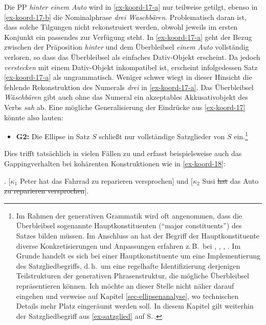 Die PP {\it hinter einem Auto} wird in \ref{ex-koord-17-a} nur teilweise getilgt, ebenso in \ref{ex-koord-17-b} die Nominalphrase {\it drei Waschbären}. Problematisch daran ist, dass solche Tilgungen nicht rekonstruiert werden, obwohl jeweils im ersten Konjunkt ein passendes  zur Verfügung steht. In \ref{ex-koord-17-a} geht der Bezug zwischen der Präposition {\it hinter} und dem Überbleibsel {\it einem Auto} vollständig verloren, so dass das Überbleibsel als einfaches Dativ-Objekt erscheint. Da jedoch {\it verstecken} mit einem Dativ-Objekt inkompatibel ist, erscheint infolgedessen Satz \ref{ex-koord-17-a} als ungrammatisch. Weniger schwer wiegt in dieser Hinsicht die fehlende Rekonstruktion des Numerals {\it drei} in \ref{ex-koord-17-a}. Das Überbleibsel {\it Wäschbären} gibt auch ohne das Numeral ein akzeptables Akkusativobjekt des Verbs {\it sah} ab. Eine mögliche Generalisierung der Eindrücke aus \ref{ex-koord-17} könnte also lauten:
\begin{itemize}
  \item[] {\bf G2:} Die Ellipse in Satz $S$ schlie\ss t nur vollständige Satzglieder von $S$ ein.\footnote{Im Rahmen der generativen Grammatik wird oft angenommen, dass die Überbleibsel sogenannte Hauptkonstituenten ("`major constituents"') des Satzes bilden müssen. Im Anschluss an \citet[Fußnote~2]{Hankamer:73} hat der Begriff der Hauptkonstituente diverse Konkretisierungen und Anpassungen erfahren z.\,B.\  bei \citet[110ff]{Neijt:79}, \citet[12ff]{Chao:87}, \citet[Fußnote 10]{Wilder:97}, \citet[145ff]{Hartmann:00}. Im Grunde handelt es sich bei einer Hauptkonstituente um eine Implementierung des Satzgliedbegriffs, d.\,h.\ um eine regelhafte Identifizierung derjenigen Teilstrukturen der generativen Phrasenstruktur, die mögliche Überbleibsel repräsentieren können. Ich möchte an dieser Stelle nicht näher darauf eingehen und verweise auf Kapitel \ref{sec-ellipsenanalyse}, wo technischen Details mehr Platz eingeräumt werden soll. In diesem Kapitel gilt weiterhin der Satzgliedbegriff aus \ref{ex-satzglied} auf S.\,\pageref{ex-satzglied}.}
\end{itemize} 
Dies trifft tatsächlich in vielen Fällen zu und erfasst beispielsweise auch das Gappingverhalten bei kohärenten Konstruktionen wie in \ref{ex-koord-18}: 

\ex. \label{ex-koord-18}[$\kappa_1$ Peter hat das Fahrrad zu reparieren versprochen] und [$\kappa_2$ Susi \sout{hat} das Auto \sout{zu reparieren versprochen}].

